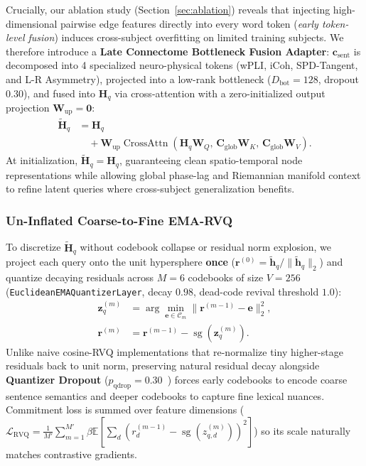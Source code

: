 \documentclass[journal]{IEEEtran}
\begin{document}
Crucially, our ablation study (Section~\ref{sec:ablation}) reveals that injecting high-dimensional pairwise edge features directly into every word token (\textit{early token-level fusion}) induces cross-subject overfitting on limited training subjects. We therefore introduce a \textbf{Late Connectome Bottleneck Fusion Adapter}: $\mathbf{c}_{\text{sent}}$ is decomposed into 4 specialized neuro-physical tokens (wPLI, iCoh, SPD-Tangent, and L-R Asymmetry), projected into a low-rank bottleneck ($D_{\text{bot}}=128$, dropout $0.30$), and fused into $\mathbf{H}_q$ via cross-attention with a zero-initialized output projection $\mathbf{W}_{\text{up}} = \mathbf{0}$:
\begin{equation}
\begin{aligned}
    \tilde{\mathbf{H}}_q &= \mathbf{H}_q \\
    &\quad + \mathbf{W}_{\text{up}} \operatorname{CrossAttn}\!\left(\mathbf{H}_q \mathbf{W}_Q,\, \mathbf{C}_{\text{glob}}\mathbf{W}_K,\, \mathbf{C}_{\text{glob}}\mathbf{W}_V\right).
\end{aligned}
\end{equation}
At initialization, $\tilde{\mathbf{H}}_q = \mathbf{H}_q$, guaranteeing clean spatio-temporal node representations while allowing global phase-lag and Riemannian manifold context to refine latent queries where cross-subject generalization benefits.

\subsubsection{Un-Inflated Coarse-to-Fine EMA-RVQ}
To discretize $\tilde{\mathbf{H}}_q$ without codebook collapse or residual norm explosion, we project each query onto the unit hypersphere \textbf{once} ($\mathbf{r}^{(0)} = \tilde{\mathbf{h}}_q / \|\tilde{\mathbf{h}}_q\|_2$) and quantize decaying residuals across $M=6$ codebooks of size $V=256$ (\texttt{EuclideanEMAQuantizerLayer}, decay $0.98$, dead-code revival threshold $1.0$):
\begin{align}
    \mathbf{z}_q^{(m)} &= \arg\min_{\mathbf{e} \in \mathcal{C}_m} \|\mathbf{r}^{(m-1)} - \mathbf{e}\|_2^2, \\
    \mathbf{r}^{(m)} &= \mathbf{r}^{(m-1)} - \operatorname{sg}\!\left(\mathbf{z}_q^{(m)}\right).
\end{align}
Unlike naive cosine-RVQ implementations that re-normalize tiny higher-stage residuals back to unit norm, preserving natural residual decay alongside \textbf{Quantizer Dropout} ($p_{\text{qdrop}} = 0.30$~\cite{zeghidour2021soundstream}) forces early codebooks to encode coarse sentence semantics and deeper codebooks to capture fine lexical nuances. Commitment loss is summed over feature dimensions ($\mathcal{L}_{\text{RVQ}} = \frac{1}{M'}\sum_{m=1}^{M'} \beta \mathbb{E}[\sum_{d}(r_d^{(m-1)} - \operatorname{sg}(z_{q,d}^{(m)}))^2]$) so its scale naturally matches contrastive gradients.
\end{document}
